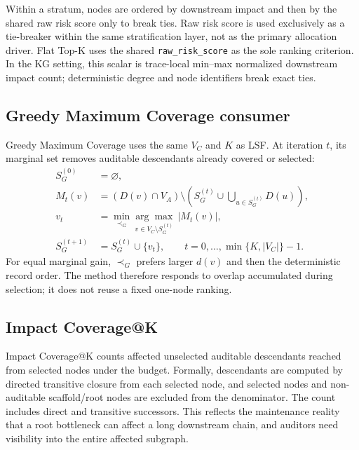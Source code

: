 \documentclass[pdflatex,sn-basic]{sn-jnl}
\begin{document}
Within a stratum, nodes are ordered by downstream impact and then by the shared raw risk score only to break ties. Raw risk score is used exclusively as a tie-breaker within the same stratification layer, not as the primary allocation driver. Flat Top-K uses the shared \texttt{raw\_risk\_score} as the sole ranking criterion. In the KG setting, this scalar is trace-local min--max normalized downstream impact count; deterministic degree and node identifiers break exact ties.

\subsection{Greedy Maximum Coverage consumer}

Greedy Maximum Coverage uses the same $V_C$ and $K$ as LSF. At iteration $t$, its marginal set removes auditable descendants already covered or selected:
\begin{equation}
\begin{aligned}
S_G^{(0)}&=\varnothing,\\
M_t(v)&=\left(D(v)\cap V_A\right)\setminus
\left(S_G^{(t)}\cup\bigcup_{u\in S_G^{(t)}}D(u)\right),\\
v_t&=\min_{\prec_G}
\underset{v\in V_C\setminus S_G^{(t)}}{\arg\max}\ |M_t(v)|,\\
S_G^{(t+1)}&=S_G^{(t)}\cup\{v_t\},
\qquad t=0,\ldots,\min\{K,|V_C|\}-1.
\end{aligned}
\label{eq:greedy-marginal}
\end{equation}
For equal marginal gain, $\prec_G$ prefers larger $d(v)$ and then the deterministic record order. The method therefore responds to overlap accumulated during selection; it does not reuse a fixed one-node ranking.

\subsection{Impact Coverage@K}

Impact Coverage@K counts affected unselected auditable descendants reached from selected nodes under the budget. Formally, descendants are computed by directed transitive closure from each selected node, and selected nodes and non-auditable scaffold/root nodes are excluded from the denominator. The count includes direct and transitive successors. This reflects the maintenance reality that a root bottleneck can affect a long downstream chain, and auditors need visibility into the entire affected subgraph.
\end{document}
